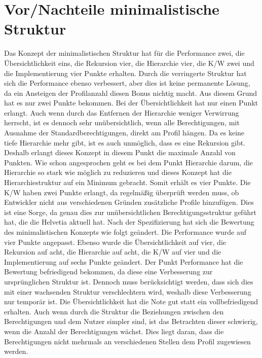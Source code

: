 \section{Vor/Nachteile minimalistische Struktur}
\label{sec:chapter05:Minimalistisch}
Das Konzept der minimalistischen Struktur hat für die Performance zwei, die Übersichtlichkeit eins, die Rekursion vier, die Hierarchie vier, die \ac{K/W} zwei und die Implementierung vier Punkte erhalten.
Durch die verringerte Struktur hat sich die Performance ebenso verbessert, aber dies ist keine permanente Lösung, da ein Ansteigen der Profilanzahl diesen Bonus nichtig macht.
Aus diesem Grund hat es nur zwei Punkte bekommen.
Bei der Übersichtlichkeit hat nur einen Punkt erlangt.
Auch wenn durch das Entfernen der Hierarchie weniger Verwirrung herrscht, ist es dennoch sehr unübersichtlich, wenn alle Berechtigungen, mit Ausnahme der Standardberechtigungen, direkt am Profil hängen.
Da es keine tiefe Hierarchie mehr gibt, ist es auch unmöglich, dass es eine Rekursion gibt.
Deshalb erlangt dieses Konzept in diesem Punkt die maximale Anzahl von Punkten.
Wie schon angesprochen geht es bei dem Punkt Hierarchie darum, die Hierarchie so stark wie möglich zu reduzieren und dieses Konzept hat die Hierarchiestruktur auf ein Minimum gebracht. Somit erhält es vier Punkte.
Die \ac{K/W} haben zwei Punkte erlangt, da regelmäßig überprüft werden muss, ob Entwickler nicht aus verschiedenen Gründen zusätzliche Profile hinzufügen.
Dies ist eine Sorge, da genau dies zur unübersichtlichen Berechtigungsstruktur geführt hat, die die Helvetia aktuell hat.
\newline
\newline
Nach der Spezifizierung hat sich die Bewertung des minimalistischen Konzepts wie folgt geändert.
Die Performance wurde auf vier Punkte angepasst. Ebenso wurde die Übersichtlichkeit auf vier, die Rekursion auf acht, die Hierarchie auf acht, die \ac{K/W} auf vier und die Implementierung auf sechs Punkte geändert.
Der Punkt Performance hat die Bewertung befriedigend bekommen, da diese eine Verbesserung zur ursprünglichen Struktur ist.
Dennoch muss berücksichtigt werden, dass sich dies mit einer wachsenden Struktur verschlechtern wird, weshalb diese Verbesserung nur temporär ist.
Die Übersichtlichkeit hat die Note gut statt ein vollbefriedigend erhalten.
Auch wenn durch die Struktur die Beziehungen zwischen den Berechtigungen und dem Nutzer simpler sind, ist das Betrachten dieser schwierig, wenn die Anzahl der Berechtigungen wächst.
Dies liegt daran, dass die Berechtigungen nicht mehrmals an verschiedenen Stellen dem Profil zugewiesen werden.
